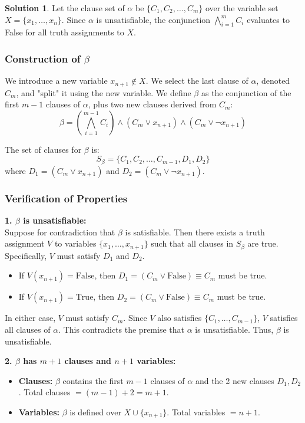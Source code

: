 \documentclass[12pt,a4paper]{article}
\theoremstyle{definition}
\newtheorem{solution}{Solution}
\begin{document}
\begin{solution}
Let the clause set of $\alpha$ be $\{C_1, C_2, \dots, C_m\}$ over the variable set $X = \{x_1, \dots, x_n\}$.
Since $\alpha$ is unsatisfiable, the conjunction $\bigwedge_{i=1}^m C_i$ evaluates to False for all truth assignments to $X$.

\subsubsection*{Construction of $\beta$}
We introduce a new variable $x_{n+1} \notin X$.
We select the last clause of $\alpha$, denoted $C_m$, and "split" it using the new variable.
We define $\beta$ as the conjunction of the first $m-1$ clauses of $\alpha$, plus two new clauses derived from $C_m$:
$$ \beta = \left( \bigwedge_{i=1}^{m-1} C_i \right) \land (C_m \lor x_{n+1}) \land (C_m \lor \neg x_{n+1}) $$

The set of clauses for $\beta$ is:
$$ S_\beta = \{C_1, C_2, \dots, C_{m-1}, D_1, D_2\} $$
where $D_1 = (C_m \lor x_{n+1})$ and $D_2 = (C_m \lor \neg x_{n+1})$.

\subsubsection*{Verification of Properties}

\textbf{1. $\beta$ is unsatisfiable:} \\
Suppose for contradiction that $\beta$ is satisfiable. Then there exists a truth assignment $V$ to variables $\{x_1, \dots, x_{n+1}\}$ such that all clauses in $S_\beta$ are true.
Specifically, $V$ must satisfy $D_1$ and $D_2$.
\begin{itemize}
    \item If $V(x_{n+1}) = \text{False}$, then $D_1 = (C_m \lor \text{False}) \equiv C_m$ must be true.
    \item If $V(x_{n+1}) = \text{True}$, then $D_2 = (C_m \lor \text{False}) \equiv C_m$ must be true.
\end{itemize}
In either case, $V$ must satisfy $C_m$. Since $V$ also satisfies $\{C_1, \dots, C_{m-1}\}$, $V$ satisfies all clauses of $\alpha$. This contradicts the premise that $\alpha$ is unsatisfiable. Thus, $\beta$ is unsatisfiable.

\textbf{2. $\beta$ has $m+1$ clauses and $n+1$ variables:} \\
\begin{itemize}
    \item \textbf{Clauses:} $\beta$ contains the first $m-1$ clauses of $\alpha$ and the 2 new clauses $D_1, D_2$. Total clauses $= (m-1) + 2 = m+1$.
    \item \textbf{Variables:} $\beta$ is defined over $X \cup \{x_{n+1}\}$. Total variables $= n + 1$.
\end{itemize}


\end{solution}
\end{document}
